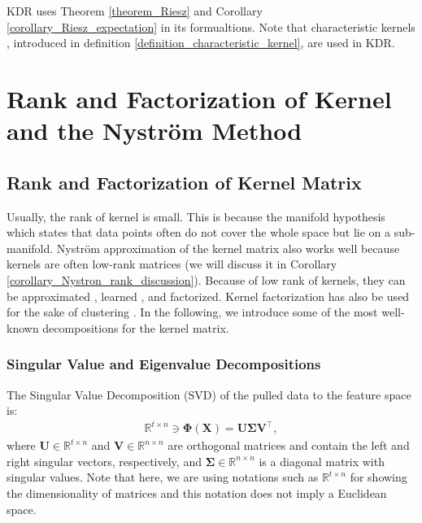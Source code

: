 \documentclass[lang=cn,10pt]{gorgeousnbook}
\numberwithin{equation}{section}%
\numberwithin{figure}{section}%
\begin{document}
KDR uses Theorem \ref{theorem_Riesz} and Corollary \ref{corollary_Riesz_expectation} in its formualtions. 
Note that characteristic kernels \cite{fukumizu2008characteristic}, introduced in definition \ref{definition_characteristic_kernel}, are used in KDR. 


\section{Rank and Factorization of Kernel and the Nystr{\"o}m Method}\label{section_factorization_and_Nystrom_method}

\subsection{Rank and Factorization of Kernel Matrix}

Usually, the rank of kernel is small. This is because the manifold hypothesis which states that data points often do not cover the whole space but lie on a sub-manifold. Nystr{\"o}m approximation of the kernel matrix also works well because kernels are often low-rank matrices (we will discuss it in Corollary \ref{corollary_Nystron_rank_discussion}). 
Because of low rank of kernels, they can be approximated \cite{kishore2017literature}, learned \cite{kulis2006learning,kulis2009low}, and factorized. 
Kernel factorization has also be used for the sake of clustering \cite{wang2010low}.
In the following, we introduce some of the most well-known decompositions for the kernel matrix. 

\subsubsection{Singular Value and Eigenvalue Decompositions}

The Singular Value Decomposition (SVD) of the pulled data to the feature space is:
\begin{align}\label{equation_SVD_Phi}
\mathbb{R}^{t \times n} \ni \boldsymbol{\Phi}(\boldsymbol{X}) = \boldsymbol{U}\boldsymbol{\Sigma}\boldsymbol{V}^\top,
\end{align}
where $\boldsymbol{U} \in \mathbb{R}^{t \times n}$ and $\boldsymbol{V} \in \mathbb{R}^{n \times n}$ are orthogonal matrices and contain the left and right singular vectors, respectively, and $\boldsymbol{\Sigma} \in \mathbb{R}^{n \times n}$ is a diagonal matrix with singular values.  
Note that here, we are using notations such as $\mathbb{R}^{t \times n}$ for showing the dimensionality of matrices and this notation does not imply a Euclidean space. 
\end{document}
